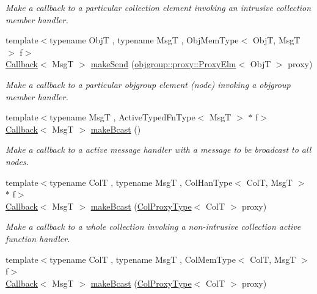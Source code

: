 \begin{DoxyCompactItemize}
\begin{DoxyCompactList}\small\item\em Make a callback to a particular collection element invoking an intrusive collection member handler. \end{DoxyCompactList}\item 
{\footnotesize template$<$typename ObjT , typename MsgT , Obj\+Mem\+Type$<$ Obj\+T, Msg\+T $>$ f$>$ }\\\hyperlink{namespacevt_a57b238783d05de96bc2c4027f7073b7f}{Callback}$<$ MsgT $>$ \hyperlink{structvt_1_1pipe_1_1_pipe_manager_aa5d48a3b64820bec240a6a61bdfb4524}{make\+Send} (\hyperlink{structvt_1_1objgroup_1_1proxy_1_1_proxy_elm}{objgroup\+::proxy\+::\+Proxy\+Elm}$<$ ObjT $>$ proxy)
\begin{DoxyCompactList}\small\item\em Make a callback to a particular objgroup element (node) invoking a objgroup member handler. \end{DoxyCompactList}\item 
{\footnotesize template$<$typename MsgT , Active\+Typed\+Fn\+Type$<$ Msg\+T $>$ $\ast$ f$>$ }\\\hyperlink{namespacevt_a57b238783d05de96bc2c4027f7073b7f}{Callback}$<$ MsgT $>$ \hyperlink{structvt_1_1pipe_1_1_pipe_manager_a2ea6bd5ea3e001662681b1e5a1971e9d}{make\+Bcast} ()
\begin{DoxyCompactList}\small\item\em Make a callback to a active message handler with a message to be broadcast to all nodes. \end{DoxyCompactList}\item 
{\footnotesize template$<$typename ColT , typename MsgT , Col\+Han\+Type$<$ Col\+T, Msg\+T $>$ $\ast$ f$>$ }\\\hyperlink{namespacevt_a57b238783d05de96bc2c4027f7073b7f}{Callback}$<$ MsgT $>$ \hyperlink{structvt_1_1pipe_1_1_pipe_manager_a1fefc503b58bbdf791e76a6c8f339df6}{make\+Bcast} (\hyperlink{structvt_1_1pipe_1_1_pipe_manager_t_l_af56c58cad882496e35f01227d4da3898}{Col\+Proxy\+Type}$<$ ColT $>$ proxy)
\begin{DoxyCompactList}\small\item\em Make a callback to a whole collection invoking a non-\/intrusive collection active function handler. \end{DoxyCompactList}\item 
{\footnotesize template$<$typename ColT , typename MsgT , Col\+Mem\+Type$<$ Col\+T, Msg\+T $>$ f$>$ }\\\hyperlink{namespacevt_a57b238783d05de96bc2c4027f7073b7f}{Callback}$<$ MsgT $>$ \hyperlink{structvt_1_1pipe_1_1_pipe_manager_a6fb7d87f8beb2c1e80d492df47036158}{make\+Bcast} (\hyperlink{structvt_1_1pipe_1_1_pipe_manager_t_l_af56c58cad882496e35f01227d4da3898}{Col\+Proxy\+Type}$<$ ColT $>$ proxy)

\end{DoxyCompactItemize}
